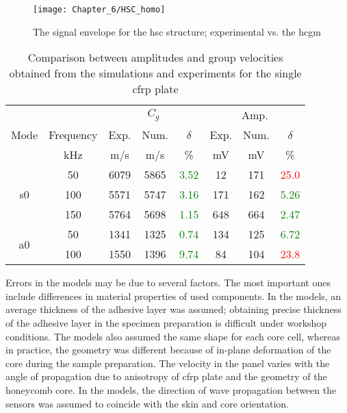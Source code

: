 \begin{figure}[!htb]
	\begin{center}
		\texttt{[image: Chapter\_6/HSC\_homo]}
	\end{center}
	\caption{The signal envelope for the \acl{hsc} structure; experimental vs. the \acf{hcgm}}
	\label{fig:hsc_homo}
\end{figure}
\begin{table}[!htb]
	\small
	\tabcolsep=0.2cm
	\centering
	\caption{\label{tab:group_velocity_cfrp} Comparison between amplitudes and group velocities obtained from the simulations and experiments for the single \acs{cfrp} plate}
	\begin{tabular}{cccccccc}
		\toprule
		& & \multicolumn{3}{c}{\(C_g\)} & \multicolumn{3}{c}{Amp.}\\
		Mode & Frequency & Exp. & Num. & \(\delta\)& Exp. & Num. & \(\delta\)\\
		& \unit{\kHz} & \unit[per-mode = symbol]{\m\per\s} & \unit[per-mode = symbol]{\m\per\s} & \% & \unit{\mV} & \unit{\mV} & \% \\
		\midrule
		\multirow{3}{*}{\ac{s0}} & 50 & 6079 & 5865 & \textcolor{green}{3.52}& 12 & 171 & \textcolor{red}{25.0} \\
		&100& 5571 & 5747 & \textcolor{green}{3.16} & 171 & 162 & \textcolor{green}{5.26}\\
		&150& 5764 & 5698 & \textcolor{green}{1.15} & 648 & 664 & \textcolor{green}{2.47}\\
		\midrule
		\multirow{3}{*}{\ac{a0}} &50& 1341 & 1325 & \textcolor{green}{0.74} & 134 & 125 & \textcolor{green}{6.72}\\
		&100& 1550 & 1396 & \textcolor{green}{9.74} & 84 & 104 & \textcolor{red}{23.8}\\
		\bottomrule
	\end{tabular}
\end{table}

Errors in the models may be due to several factors.
The most important ones include differences in material properties of used components.
In the models, an average thickness of the adhesive layer was assumed; obtaining precise thickness of the adhesive layer in the specimen preparation is difficult under workshop conditions.
The models also assumed the same shape for each core cell, whereas in practice, the geometry was different because of in-plane deformation of the core during the sample preparation.
The velocity in the panel varies with the angle of propagation due to anisotropy of \ac{cfrp} plate and the geometry of the honeycomb core.
In the models, the direction of wave propagation between the sensors was assumed to coincide with the skin and core orientation.
\clearpage


